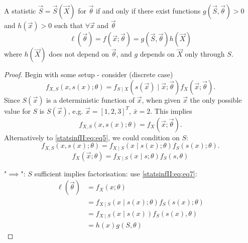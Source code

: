 \documentclass[10pt, a4paper]{article}
\begin{document}
\begin{lemma}
    A statistic $\vec{S} = \vec{S}(\vec{X})$ for $\vec{\theta}$ if and only if there exist functions $g(\vec{S}, \vec{\theta}) > 0$ and $h(\vec{x}) > 0$ such that $\forall \vec{x}$ and $\vec{\theta}$
    \[
    \ell(\vec{\theta}) = f(\vec{x}; \vec{\theta}) = g(\vec{S}, \vec{\theta})h(\vec{X})
    \]
    where $h(\vec{X})$ does not depend on $\vec{\theta}$,
    and $g$ depends on $\vec{X}$ only through $S$.

    \begin{proof}
        Begin with some setup -
        consider
        (discrete case)
        \begin{equation}\label{statsinfII:eq:eq5}\tag{1}
            f_{X, S}(x, s(x); \theta) = f_{S \mid X}(s(\vec{x}) \mid \vec{x}; \vec{\theta})f_{X}(\vec{x}; \vec{\theta}).
        \end{equation}
        Since $S(\vec{x})$ is a deterministic function of $\vec{x}$,
        when given $\vec{x}$ the only possible value for $S$ is $S(\vec{x})$,
        e.g. $\vec{x} = [1, 2, 3] ^ T$,
        $\bar{x} = 2$.
        This implies
        \begin{equation}\label{statsinfII:eq:eq6}\tag{2}
            f_{X, S}(x, s(x); \theta) = f_{X}(\vec{x}; \vec{\theta}).
        \end{equation}
        Alternatively to \eqref{statsinfII:eq:eq5},
        we could condition on $S$:
        \[
        f_{X, S}(x, s(x); \theta) = f_{X \mid S}(x \mid s(x); \theta)f_{S}(s(x); \theta).
        \]
        \begin{equation}\label{statsinfII:eq:eq7}\tag{3}
            f_{X}(\vec{x}; \theta) = f_{X \mid S}(x \mid s; \theta)f_{S}(s, \theta)
        \end{equation}

        "$\implies$":
        $S$ sufficient implies factorisation:
        use \eqref{statsinfII:eq:eq7}:
        \begin{align*}
            \ell(\vec{\theta}) &= f_{X}(x; \theta) \\
            &= f_{X \mid S}(x \mid s(x); \theta)f_{S}(s(x); \theta) \\
            &= f_{X \mid S}(x \mid s(x))f_{S}(s(x), \theta) \\
            &= h(x)g(S, \theta)
        \end{align*}


\end{proof}
\end{lemma}
\end{document}
